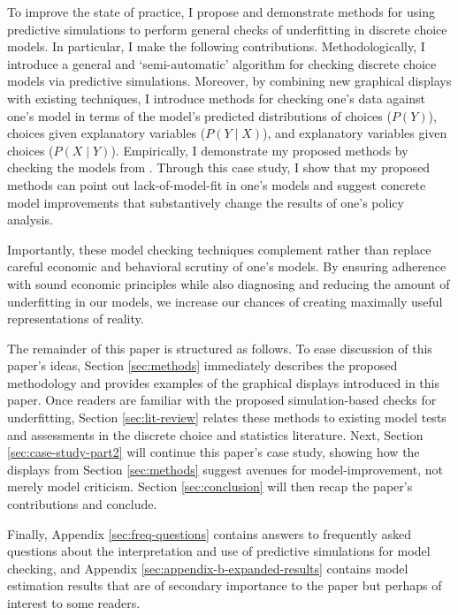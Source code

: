 \documentclass[preprint]{elsarticle}
\begin{document}
To improve the state of practice, I propose and demonstrate methods for using predictive simulations to perform general checks of underfitting in discrete choice models. In particular, I make the following contributions.  Methodologically, I introduce a general and `semi-automatic' algorithm for checking discrete choice models via predictive simulations. Moreover, by combining new graphical displays with existing techniques, I introduce methods for checking one's data against one's model in terms of the model's predicted distributions of choices ($P \left( Y \right)$), choices given explanatory variables ($P \left( Y \mid X \right)$), and explanatory variables given choices ($P \left( X \mid Y \right)$). Empirically, I demonstrate my proposed methods by checking the models from \citet{brownstone_forecasting_1998}. Through this case study, I show that my proposed methods can point out lack-of-model-fit in one's models and suggest concrete model improvements that substantively change the results of one's policy analysis.

Importantly, these model checking techniques complement rather than replace careful economic and behavioral scrutiny of one's models. By ensuring adherence with sound economic principles while also diagnosing and reducing the amount of underfitting in our models, we increase our chances of creating maximally useful representations of reality.

The remainder of this paper is structured as follows. To ease discussion of this paper's ideas, Section \ref{sec:methods} immediately describes the proposed methodology and provides examples of the graphical displays introduced in this paper. Once readers are familiar with the proposed simulation-based checks for underfitting, Section \ref{sec:lit-review} relates these methods to existing model tests and assessments in the discrete choice and statistics literature. Next, Section \ref{sec:case-study-part2} will continue this paper's case study, showing how the displays from Section \ref{sec:methods} suggest avenues for model-improvement, not merely model criticism. Section \ref{sec:conclusion} will then recap the paper's contributions and conclude.

Finally, Appendix \ref{sec:freq-questions} contains answers to frequently asked questions about the interpretation and use of predictive simulations for model checking, and Appendix \ref{sec:appendix-b-expanded-results} contains model estimation results that are of secondary importance to the paper but perhaps of interest to some readers.
\end{document}
